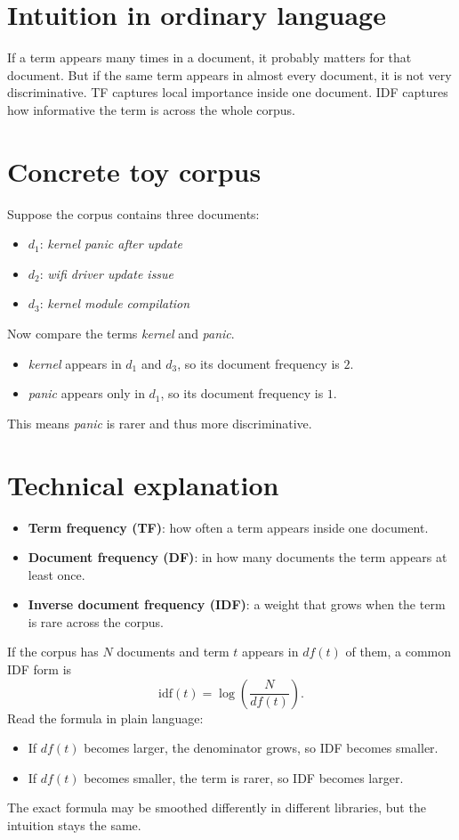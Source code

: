 \documentclass[11pt,oneside]{report}
\newcommand{\term}[1]{\textbf{#1}}
\begin{document}
\section*{Intuition in ordinary language}
If a term appears many times in a document, it probably matters for that document. But if the same term appears in almost every document, it is not very discriminative. TF captures local importance inside one document. IDF captures how informative the term is across the whole corpus.

\section*{Concrete toy corpus}
Suppose the corpus contains three documents:
\begin{itemize}
\item $d_1$: \emph{kernel panic after update}
\item $d_2$: \emph{wifi driver update issue}
\item $d_3$: \emph{kernel module compilation}
\end{itemize}
Now compare the terms \emph{kernel} and \emph{panic}.
\begin{itemize}
\item \emph{kernel} appears in $d_1$ and $d_3$, so its document frequency is $2$.
\item \emph{panic} appears only in $d_1$, so its document frequency is $1$.
\end{itemize}
This means \emph{panic} is rarer and thus more discriminative.

\section*{Technical explanation}
\begin{itemize}
\item \term{Term frequency (TF)}: how often a term appears inside one document.
\item \term{Document frequency (DF)}: in how many documents the term appears at least once.
\item \term{Inverse document frequency (IDF)}: a weight that grows when the term is rare across the corpus.
\end{itemize}

\begin{formulabox}
If the corpus has $N$ documents and term $t$ appears in $df(t)$ of them, a common IDF form is
\[
\mathrm{idf}(t)=\log\!\left(\frac{N}{df(t)}\right).
\]
Read the formula in plain language:
\begin{itemize}
\item If $df(t)$ becomes larger, the denominator grows, so IDF becomes smaller.
\item If $df(t)$ becomes smaller, the term is rarer, so IDF becomes larger.
\end{itemize}
The exact formula may be smoothed differently in different libraries, but the intuition stays the same.
\end{formulabox}
\end{document}
